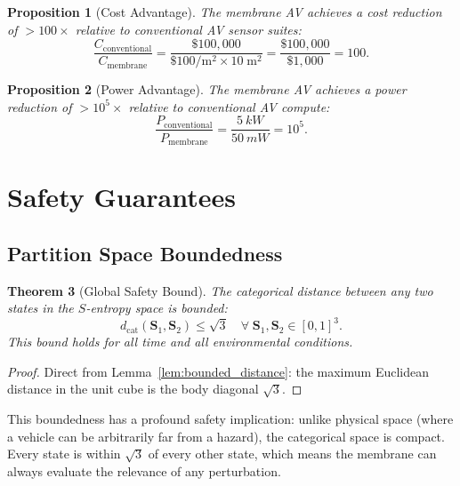 \documentclass[12pt]{article}
\newtheorem{theorem}{Theorem}[section]
\newtheorem{proposition}[theorem]{Proposition}
\theoremstyle{definition}
\theoremstyle{remark}
\newcommand{\dcat}{d_{\mathrm{cat}}}
\begin{document}
\begin{proposition}[Cost Advantage]
\label{prop:cost}
The membrane AV achieves a cost reduction of $> 100\times$ relative to conventional AV sensor suites:
\begin{equation}
  \frac{C_{\mathrm{conventional}}}{C_{\mathrm{membrane}}} = \frac{\$100{,}000}{\$100/\mathrm{m}^2 \times 10\;\mathrm{m}^2} = \frac{\$100{,}000}{\$1{,}000} = 100.
  \label{eq:cost_ratio}
\end{equation}
\end{proposition}

\begin{proposition}[Power Advantage]
\label{prop:power}
The membrane AV achieves a power reduction of $> 10^5\times$ relative to conventional AV compute:
\begin{equation}
  \frac{P_{\mathrm{conventional}}}{P_{\mathrm{membrane}}} = \frac{\SI{5}{kW}}{\SI{50}{mW}} = 10^5.
  \label{eq:power_ratio}
\end{equation}
\end{proposition}


\section{Safety Guarantees}
\label{sec:safety}

\subsection{Partition Space Boundedness}

\begin{theorem}[Global Safety Bound]
\label{thm:global_safety}
The categorical distance between any two states in the $S$-entropy space is bounded:
\begin{equation}
  \dcat(\mathbf{S}_1, \mathbf{S}_2) \leq \sqrt{3} \quad \forall\; \mathbf{S}_1, \mathbf{S}_2 \in [0,1]^3.
  \label{eq:global_safety}
\end{equation}
This bound holds for all time and all environmental conditions.
\end{theorem}

\begin{proof}
Direct from Lemma~\ref{lem:bounded_distance}: the maximum Euclidean distance in the unit cube is the body diagonal $\sqrt{3}$.
\end{proof}

This boundedness has a profound safety implication: unlike physical space (where a vehicle can be arbitrarily far from a hazard), the categorical space is compact. Every state is within $\sqrt{3}$ of every other state, which means the membrane can always evaluate the relevance of any perturbation.
\end{document}
